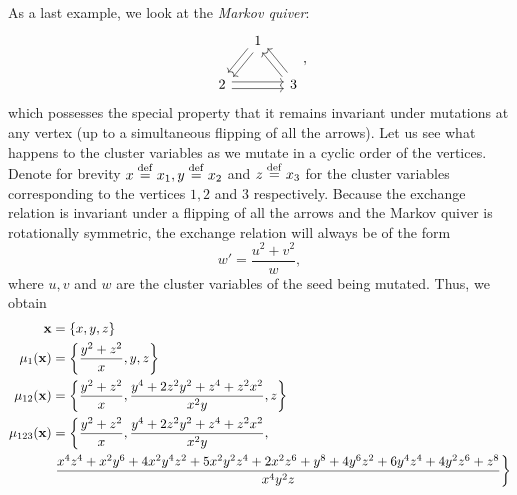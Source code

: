 \begin{example}\label{exmp:markov_quiver}
	As a last example, we look at the \emph{Markov quiver}:
	\begin{equation*}
		\begin{tikzcd}[column sep= small]
			& 1 \ar[ld, shift left] \ar[ld, shift right]\\
			2 \ar[rr, shift left] \ar[rr, shift right] && 3 \ar[lu, shift left] \ar[lu, shift right]
		\end{tikzcd},
	\end{equation*}
	which possesses the special property that it remains invariant under mutations at any
	vertex (up to a simultaneous flipping of all the arrows). Let us see what happens to
	the cluster variables as we mutate in a cyclic order of the vertices. Denote for
	brevity $x \overset{\mathrm{def}}{=} x_1, y \overset{\mathrm{def}}{=} x_2$ and $z \overset{\mathrm{def}}{=} x_3$ for the cluster variables
	corresponding to the vertices $1,2$ and $3$ respectively. Because the exchange relation
	is invariant under a flipping of all the arrows and the Markov quiver is rotationally
	symmetric, the exchange relation will always be of the form
	\begin{equation*}
		w' = \frac{u^2 + v^2}{w},
	\end{equation*}
	where $u, v$ and $w$ are the cluster variables of the seed being mutated. Thus, we
	obtain
	\begin{align*}
		\bx            & = \{x, y, z\}                                                                                                                                                                               \\
		\mu_1(\bx)     & = \left\{\frac{y^2 + z^2}{x}, y, z\right\}                                                                                                                                                  \\
		\mu_{12}(\bx)  & = \left\{\frac{y^2 + z^2}{x}, \frac{y^4 + 2 z^2y^2 +z^4 + z^2x^2 }{x^2y}, z\right\}                                                                                                         \\
		\mu_{123}(\bx) & = \left\{\frac{y^2 + z^2}{x}, \frac{y^4 + 2 z^2y^2 +z^4 + z^2x^2 }{x^2y},\right.                                                                                                            \\
		               & \left. \frac{x^{4} z^{4} + x^{2} y^{6} + 4 x^{2} y^{4} z^{2} + 5 x^{2} y^{2} z^{4} + 2 x^{2} z^{6} + y^{8} + 4 y^{6} z^{2} + 6 y^{4} z^{4} + 4 y^{2} z^{6} + z^{8}}{x^{4} y^{2} z} \right\}

\end{align*}
\end{example}

